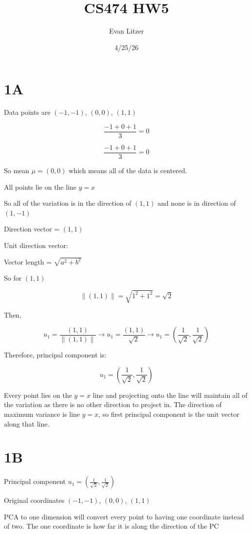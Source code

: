 \documentclass[11pt]{article}
\title{CS474 HW5}
\author{Evan Litzer}
\date{4/25/26}
\begin{document}
\maketitle

\section*{1A}

Data points are $(-1, -1)$, $(0, 0)$, $(1, 1)$

\[
\frac{-1 + 0 + 1}{3} = 0
\]

\[
\frac{-1 + 0 + 1}{3} = 0
\]

So mean $\mu = (0, 0)$ which means all of the data is centered.

All points lie on the line $y = x$

So all of the variation is in the direction of $(1, 1)$ and none is in direction of $(1, -1)$

Direction vector = $(1, 1)$

Unit direction vector:

Vector length = $\sqrt{a^2 + b^2}$

So for $(1, 1)$

\[
\|(1, 1)\| = \sqrt{1^2 + 1^2} = \sqrt{2}
\]

Then,

\[
u_1 = \frac{(1, 1)}{\|(1, 1)\|} \rightarrow u_1 = \frac{(1, 1)}{\sqrt{2}} \rightarrow u_1 = \left(\frac{1}{\sqrt{2}}, \frac{1}{\sqrt{2}}\right)
\]

Therefore, principal component is:

\[
u_1 = \left(\frac{1}{\sqrt{2}}, \frac{1}{\sqrt{2}}\right)
\]

Every point lies on the $y = x$ line and projecting onto the line will maintain all of the variation as there is no other direction to project in. The direction of maximum variance is line $y = x$, so first principal component is the unit vector along that line.

\section*{1B}

Principal component $u_1 = \left(\frac{1}{\sqrt{2}}, \frac{1}{\sqrt{2}}\right)$

Original coordinates $(-1, -1)$, $(0, 0)$, $(1, 1)$

PCA to one dimension will convert every point to having one coordinate instead of two. The one coordinate is how far it is along the direction of the PC
\end{document}
